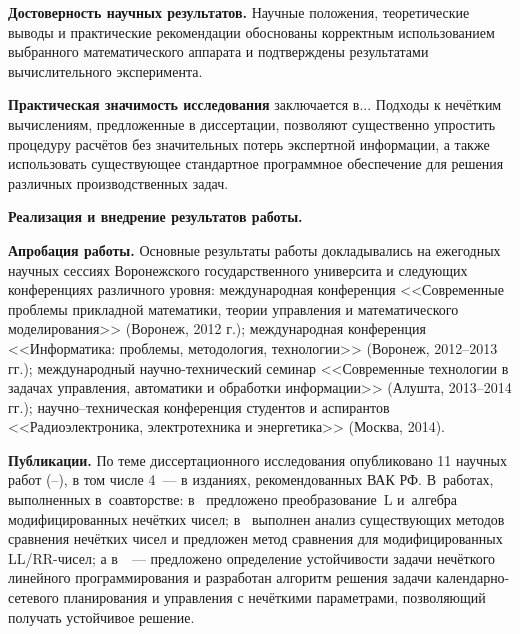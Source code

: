 \textbf{Достоверность научных результатов.} Научные положения, теоретические выводы и практические рекомендации обоснованы корректным использованием выбранного математического аппарата и подтверждены результатами вычислительного эксперимента.

\textbf{Практическая значимость исследования} заключается в... Подходы к нечётким вычислениям, предложенные в диссертации, позволяют существенно упростить процедуру расчётов без значительных потерь экспертной информации, а также использовать существующее стандартное программное обеспечение для решения различных производственных задач.

\textbf{Реализация и внедрение результатов работы.}

\textbf{Апробация работы.} Основные результаты работы докладывались на ежегодных научных сессиях Воронежского государственного университа и следующих конференциях различного уровня: международная конференция <<Современные проблемы прикладной математики, теории управления и математического моделирования>> (Воронеж, 2012 г.); международная конференция <<Информатика: проблемы, методология, технологии>> (Воронеж, 2012--2013 гг.); международный научно-технический семинар <<Современные технологии в задачах управления, автоматики и обработки информации>> (Алушта, 2013--2014 гг.); научно--техническая конференция студентов и аспирантов <<Радиоэлектроника, электротехника и энергетика>> (Москва, 2014).

\textbf{Публикации.} По теме диссертационного исследования опубликовано 11 научных работ (\cite{PMTYMM}--\cite{Kanischeva}), в том числе 4~--- в изданиях, рекомендованных ВАК РФ. В~работах, выполненных в~соавторстве: в~\cite{Vorontsov_PI} предложено преобразование~L и~алгебра модифицированных нечётких чисел; в~\cite{Vorontsov_Compare} выполнен анализ существующих методов сравнения нечётких чисел и предложен метод сравнения для модифицированных LL/RR-чисел; а в~\cite{Vorontsov_VSTU}~--- предложено определение устойчивости задачи нечёткого линейного программирования и разработан алгоритм решения задачи календарно-сетевого планирования и управления с нечёткими параметрами, позволяющий получать устойчивое решение.